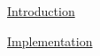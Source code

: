 \documentclass[a4paper,10pt]{article}
\begin{document}
\underline{Introduction}


\underline{Implementation}
\end{document}
